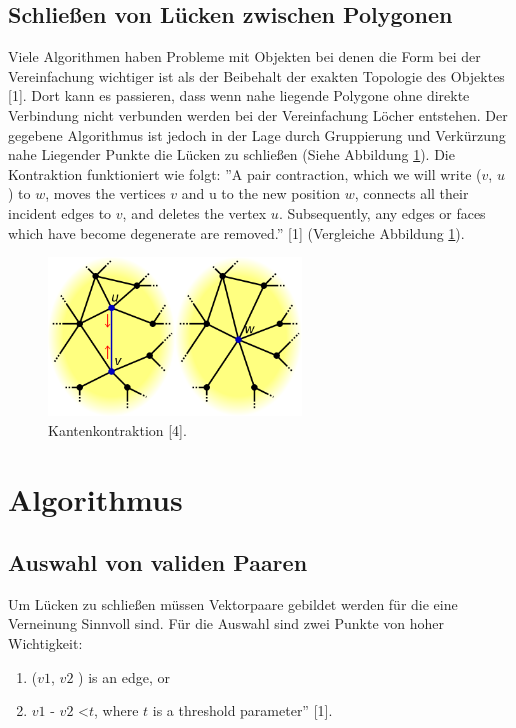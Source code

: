 \documentclass[runningheads]{llncs}
\begin{document}
\subsection{Schließen von Lücken zwischen Polygonen}
    Viele Algorithmen haben Probleme mit Objekten bei denen die Form bei der Vereinfachung wichtiger ist als der Beibehalt der exakten Topologie des Objektes [1]. 
    Dort kann es passieren, dass wenn nahe liegende Polygone ohne direkte Verbindung nicht verbunden werden bei der Vereinfachung Löcher entstehen. Der gegebene Algorithmus ist jedoch in der Lage durch Gruppierung und Verkürzung nahe Liegender Punkte die Lücken zu schließen (Siehe Abbildung \ref{fig:KantenKontraktion}). \newline
    Die Kontraktion funktioniert wie folgt:\newline
    ''A pair contraction, which we will
    write ($v$, $u$ ) to $w$, moves the vertices $v$ and u to the new position
    $w$, connects all their incident edges to $v$, and deletes the vertex $u$. 
    Subsequently, any edges or faces which have become degenerate are removed.'' [1] (Vergleiche Abbildung \ref{fig:KantenKontraktion}).
    
    \begin{figure}[ht]
	\centering
	\includegraphics[width=0.6\textwidth]{KantenKontraktion.png}
	\caption{Kantenkontraktion [4].}
	\label{fig:KantenKontraktion}
    \end{figure}

\noindent

\section{Algorithmus}
\subsection{Auswahl von validen Paaren}
    Um Lücken zu schließen müssen Vektorpaare gebildet werden für die eine Verneinung Sinnvoll sind. Für die Auswahl sind zwei Punkte von hoher Wichtigkeit:
    \begin{enumerate}
    \item[``1.] ($v1$, $v2$ ) is an edge, or
    \item[2.] \textbar \textbar $v1$ - $v2$ \textbar \textbar \textless $t$, where $t$ is a threshold parameter'' [1].
    \end{enumerate}
\end{document}
